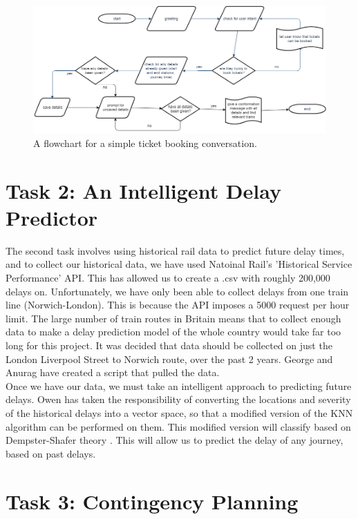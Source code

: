 \documentclass[12pt,a4paper]{article}
\begin{document}
    \begin{figure}[H]
        \centering
        \includegraphics[scale=0.4]{img.png}
        \caption{A flowchart for a simple ticket booking conversation.}
    \end{figure}
    
    \section*{Task 2: An Intelligent Delay Predictor}
    
    The second task involves using historical rail data to predict future delay times, and to collect our historical data, we have used Natoinal Rail's 'Historical Service Performance' API. This has allowed us to create a .csv with roughly 200,000 delays on. Unfortunately, we have only been able to collect delays from one train line (Norwich-London). This is because the API imposes a 5000 request per hour limit. The large number of train routes in Britain means that to collect enough data to make a delay prediction model of the whole country would take far too long for this project. It was decided that data should be collected on just the London Liverpool Street to Norwich route, over the past 2 years. George and Anurag have created a script that pulled the data. \\
    
    Once we have our data, we must take an intelligent approach to predicting future delays. Owen has taken the responsibility of converting the locations and severity of the historical delays into a vector space, so that a modified version of the KNN algorithm can be performed on them. This modified version will classify based on Dempster-Shafer theory \citep{Denoeux95}. This will allow us to predict the delay of any journey, based on past delays.
    
    \section*{Task 3: Contingency Planning}
    
\end{document}
